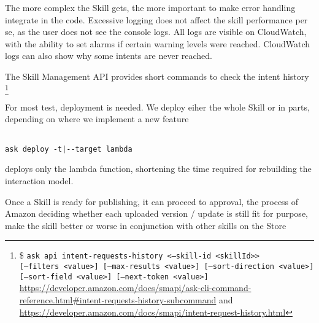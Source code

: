 The more complex the Skill gets, the more important to make error handling integrate in the code. Excessive logging does not affect the skill performance per se, as the user does not see the console logs. %
All logs are visible on CloudWatch, with the ability to set alarms if certain warning levels were reached. CloudWatch logs can also show why some intents are never reached.




The Skill Management API provides short commands to check the intent history  \footnote{\$ \texttt{ask api intent-requests-history <--skill-id <skillId>>}\\ \texttt{[--filters <value>] [--max-results <value>] [--sort-direction <value>] }
\texttt{[--sort-field <value>] [--next-token <value>]}\\


\url{https://developer.amazon.com/docs/smapi/ask-cli-command-reference.html\#intent-requests-history-subcommand} and \\ \url{https://developer.amazon.com/docs/smapi/intent-request-history.html}
}





For most test, deployment is needed.
We deploy eiher the whole Skill or in parts, depending on where we implement a new feature

\begin{verbatim}

ask deploy -t|--target lambda
\end{verbatim}

deploys only the lambda function, shortening the time required for rebuilding the interaction model.

Once a Skill is ready for publishing, it can proceed to approval, 
the process of Amazon deciding whether each uploaded version / update is still fit for purpose, make the skill better or worse in conjunction with other skills on the Store %





